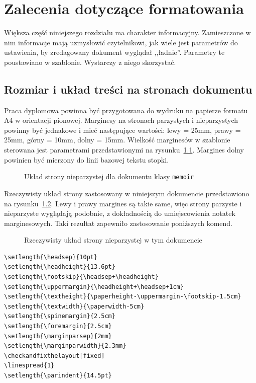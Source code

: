 \chapter{Zalecenia dotyczące formatowania}
Większa część niniejszego rozdziału ma charakter informacyjny. Zamieszczone w nim informacje mają uzmysłowić czytelnikowi, jak wiele jest parametrów do ustawienia, by zredagowany dokument wyglądał ,,ładnie''. Parametry te poustawiano w szablonie. Wystarczy z niego skorzystać.

\section{Rozmiar i układ treści na stronach dokumentu}
Praca dyplomowa powinna być przygotowana do wydruku na papierze formatu A4 w orientacji pionowej.
Marginesy na stronach parzystych i nieparzystych powinny być jednakowe i mieć następujące wartości:
lewy = 25mm, prawy = 25mm, górny = 10mm, dolny = 15mm. Wielkość marginesów w szablonie sterowana jest parametrami przedstawionymi na rysunku~\ref{fig:pageLayout}. Margines dolny powinien być mierzony do linii bazowej tekstu stopki.
\begin{figure}[htb]
\currentpage
\drawparameterstrue
\oddpagelayoutfalse
\drawstock
\caption{Układ strony nieparzystej dla dokumentu klasy \texttt{memoir}} \label{fig:pageLayout}
\end{figure}

Rzeczywisty układ strony zastosowany w niniejszym dokumencie przedstawiono na rysunku~\ref{fig:currentPageLayout}. Lewy i prawy margines są takie same, więc strony parzyste i nieparzyste wyglądają podobnie, z dokładnością do umiejscowienia notatek marginesowych. Taki rezultat zapewniło zastosowanie poniższych komend. 
\begin{figure}[t]
\currentstock
\oddpagelayouttrue
\twocolumnlayoutfalse
\drawmarginparstrue
\drawparametersfalse
\drawstock
\caption{Rzeczywisty układ strony nieparzystej w tym dokumencie} \label{fig:currentPageLayout}
\end{figure}

\begin{lstlisting}[basicstyle=\footnotesize\ttfamily]
\setlength{\headsep}{10pt} 
\setlength{\headheight}{13.6pt} 
\setlength{\footskip}{\headsep+\headheight}
\setlength{\uppermargin}{\headheight+\headsep+1cm}
\setlength{\textheight}{\paperheight-\uppermargin-\footskip-1.5cm}
\setlength{\textwidth}{\paperwidth-5cm}
\setlength{\spinemargin}{2.5cm}
\setlength{\foremargin}{2.5cm}
\setlength{\marginparsep}{2mm}
\setlength{\marginparwidth}{2.3mm}
\checkandfixthelayout[fixed] 
\linespread{1}
\setlength{\parindent}{14.5pt}
\end{lstlisting}


